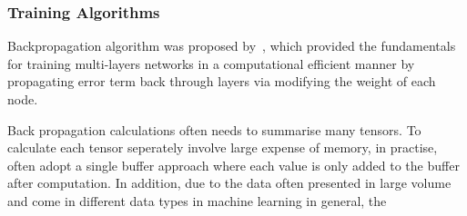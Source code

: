 \subsubsection{Training Algorithms}
Backpropagation algorithm was proposed by~\citet{werbos1975beyond}, which provided the fundamentals for training multi-layers networks in a computational efficient manner by propagating error term back through layers via modifying the weight of each node. 
\par
Back propagation calculations often needs to summarise many tensors. To calculate each tensor seperately involve large expense of memory, in practise, often adopt a single buffer approach where each value is only added to the buffer after computation. In addition, due to the data often presented in large volume and come in different data types in machine learning in general, the 